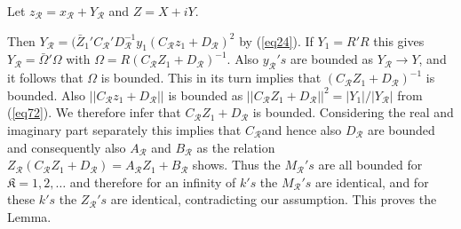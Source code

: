 Let $z_{\mathscr{R}} = x_{\mathscr{R}} + Y_{\mathscr{R}}$ and $Z =
X + iY$. 

Then $Y_{\mathscr{R}} = (\bar{Z}_1' C_{\mathscr{R}}'
D_{\mathscr{R}}^{-1} y_1 (C_{\mathscr{R}}z_1 + D_{\mathscr{R}})^2$ by
(\ref{eq24}). If $Y_1 = R'R$ this gives $Y_{\mathscr{R}} =
\bar{\Omega}'\Omega$ with $\Omega = R (C_{\mathscr{R}} Z_1 +
D_{\mathscr{R}})^{-1}$. Also $y_{\mathscr{R}}'s$ are bounded as
$Y_{\mathscr{R}} \to Y$, and it follows that $\Omega$ is bounded. This
in its turn implies that $(C_{\mathscr{R}} Z_1 +
D_{\mathscr{R}})^{-1}$ is bounded. Also $||C_{\mathscr{R}} z_1
+D_{\mathscr{R}}||$ is bounded as $||C_{\mathscr{R}} Z_1 +
D_{\mathscr{R}}||^2 = |Y_1|/|Y_{\mathscr{R}}|$ from (\ref{eq72}). We
therefore infer that $C_{\mathscr{R}} Z_1 + D_{\mathscr{R}}$ is
bounded. Considering the real and imaginary part separately this
implies that $C_{\mathscr{R}}$and hence also $D_{\mathscr{R}}$ are
bounded and consequently also $A_{\mathscr{R}}$ and $B_{\mathscr{R}}$
as the relation $Z_{\mathscr{R}}(C_{\mathscr{R}} Z_1 +
D_{\mathscr{R}}) = A_{\mathscr{R}} Z_1 + B_{\mathscr{R}}$ shows. Thus
the $M_{\mathscr{R}}' s$ are all bounded for $\mathfrak{K} =
1, 2, \ldots$ and therefore for an infinity of $k's$ the
$M_{\mathscr{R}}'s$  are identical, and for these $k's$ the
$Z_{\mathscr{R}}'s$ are identical, contradicting our assumption. This
proves the Lemma. 

